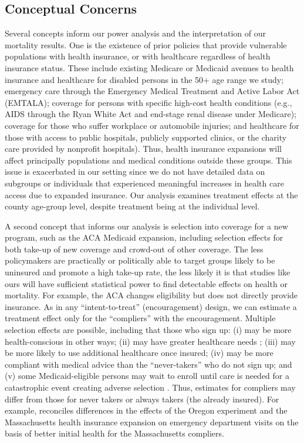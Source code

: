 \documentclass[12pt]{article}%
\begin{document}
\subsection{Conceptual Concerns}

Several concepts inform our power analysis and the interpretation of our mortality results.  
One is the existence of prior policies that provide vulnerable populations with health insurance, or with healthcare regardless of health insurance status. 
These include existing Medicare or Medicaid avenues to health insurance and healthcare for disabled persons in the 50+ age range we study; emergency care through the Emergency Medical Treatment and Active Labor Act (EMTALA); coverage for persons with specific high-cost health conditions (e.g., AIDS through the Ryan White Act and end-stage renal disease under Medicare); coverage for those who suffer workplace or automobile injuries; and healthcare for those with access to public hospitals, publicly supported clinics, or the charity care provided by nonprofit hospitals). Thus, health insurance expansions will affect principally populations and medical conditions outside these groups. This issue is exacerbated in our setting since we do not have detailed data on subgroups or individuals that experienced meaningful increases in health care access due to expanded insurance. Our analysis examines treatment effects at the county age-group level, despite treatment being at the individual level. 

A second concept that informs our analysis is selection into coverage for a new program, such as the ACA Medicaid expansion, including selection effects for both take-up of new coverage and crowd-out of other coverage. 
The less policymakers are practically or politically able to target groups likely to be uninsured and promote a high take-up rate, the less likely it is that studies like ours will have sufficient statistical power to find detectable effects on health or mortality.  
For example, the ACA changes eligibility but does not directly provide insurance.  
As in any ``intent-to-treat'' (encouragement) design, we can estimate a treatment effect only for the ``compliers'' with the encouragement.  
Multiple selection effects are possible, including that those who sign up: (i) may be more health-conscious in other ways; (ii) may have greater healthcare needs \citep[e.g.,][]{kenneyVariationMedicaidEligibility2012}; (iii) may be more likely to use additional healthcare once insured; (iv) may be more compliant with medical advice than the “never-takers” who do not sign up; and (v) some Medicaid-eligible persons may wait to enroll until care is needed for a catastrophic event creating adverse selection \citep{martonHealthInsuranceGenerosity2015}. 
Thus, estimates for compliers may differ from those for never takers or always takers (the already insured).  
For example, \citet{kowalskiReconcilingSeeminglyContradictory2018a} reconciles differences in the effects of the Oregon experiment and the Massachusetts health insurance expansion on emergency department visits on the basis of better initial health for the Massachusetts compliers. 
\end{document}
